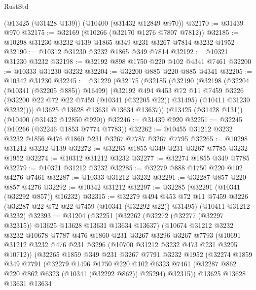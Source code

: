 \begin{lexlean}{RustStd}
\begin{coremodule}
    (@13425 (@31428 @139))
    (@10400 (@31432 @12849 @970))
@32170 := @31439 @970
@32175 := @32169 (@10266 (@32170 @1276 @7807 @7812))
@32185 := @10298 @31230 @3232 @139 @1865 @349 @231 @3267 @7814 @3232 @1952
@32190 := @10312 @31230 @3232 @1865 @349 @7814
@32192 := @10321 @31230 @3232
@32198 := @32192 @898 @1750 @220 @102 @4341 @7461
@32200 := @10333 @31230 @3232
@32204 := @32200 @885 @220 @885 @4341
@32205 := @10342 @31230
@32245 := @31229
    (@32175
      (@32185
        (@32190
          (@32198
            (@32204 (@10341 (@32205 @885)) @16499)
            (@32192
              @494
              @453
              @72
              @11
              @7459
              @3226
              (@32200 @22 @72 @22 @7459 (@10341 (@32205 @22)) @31495)
              (@10411 @31230 @3232))))
        @13625
        @13628
        @13631
        @13634
        @13637))
    (@13425 (@31428 @131))
    (@10400 (@31432 @12850 @920))
@32246 := @31439 @920
@32251 := @32245 (@10266 (@32246 @1853 @7774 @7783))
@32262 := @10455 @31212 @3232 @3232 @1856 @476 @1860 @231 @3267 @7787 @3267 @7795
@32265 := @10298 @31212 @3232 @139
@32272 := @32265 @1855 @349 @231 @3267 @7785 @3232 @1952
@32274 := @10312 @31212 @3232
@32277 := @32274 @1855 @349 @7785
@32279 := @10321 @31212 @3232
@32285 := @32279 @888 @1750 @220 @102 @4276 @7461
@32287 := @10333 @31212 @3232
@32291 := @32287 @857 @220 @857 @4276
@32292 := @10342 @31212
@32297 := @32285 (@32291 (@10341 (@32292 @857)) @16232)
@32315 := @32279
    @494
    @453
    @72
    @11
    @7459
    @3226
    (@32287 @22 @72 @22 @7459 (@10341 (@32292 @22)) @31495)
    (@10411 @31212 @3232)
@32393 := @31204
    (@32251
      (@32262
        (@32272 (@32277 (@32297 @32315)) @13625 @13628 @13631 @13634 @13637)
        (@10674
          @31212
          @3232
          @3232
          @10678
          @7787
          @476
          @1860
          @231
          @3267
          @3296
          @3267
          @7793
          (@10691 @31212 @3232 @476 @231 @3296 (@10700 @31212 @3232 @473 @231 @3295 @10712))
          (@32265
            @1859
            @349
            @231
            @3267
            @7791
            @3232
            @1952
            (@32274
              @1859
              @349
              @7791
              (@32279
                @1496
                @1750
                @220
                @102
                @6323
                @7461
                (@32287 @862 @220 @862 @6323 (@10341 (@32292 @862)) @25294)
                @32315))
            @13625
            @13628
            @13631
            @13634

\end{coremodule}
\end{lexlean}

